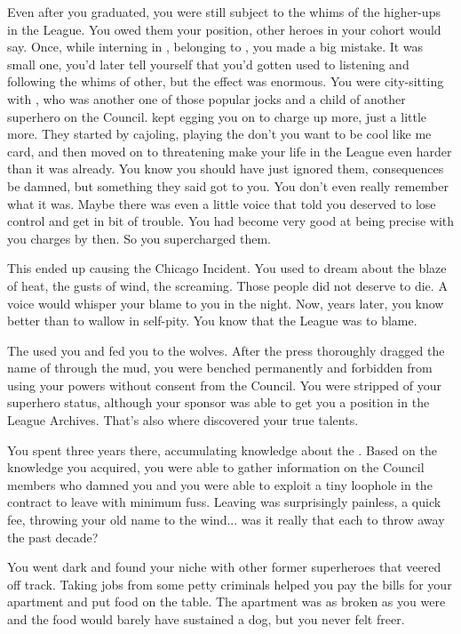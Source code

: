 \documentclass[char]{LRSguildcamp1}
\begin{document}
Even after you graduated, you were still subject to the whims of the higher-ups in the League. You owed them your position, other heroes in your cohort would say. Once, while interning in \pCityO{}, belonging to \cOS{\MYsupername}, you made a big mistake. It was small one, you'd later tell yourself that you'd gotten used to listening and following the whims of other, but the effect was enormous. You were city-sitting with  \cJuggernaut{}, who was another one of those popular jocks and a child of another superhero on the Council. \cJuggernaut{\They} kept egging you on to charge \cJuggernaut{\them} up more, just a little more. They started by cajoling, playing the don't you want to be cool like me card, and then moved on to threatening make your life in the League even harder than it was already. You know you should have just ignored them, consequences be damned, but something they said got to you. You don't even really remember what it was. Maybe there was even a little voice that told you \cJuggernaut{\they} deserved to lose control and get in bit of trouble. You had become very good at being precise with you charges by then. So you supercharged them.  

This ended up causing the Chicago Incident. You used to dream about the blaze of heat, the gusts of wind, the screaming. Those people did not deserve to die. A voice would whisper your blame to you in the night. Now, years later, you know better than to wallow in self-pity. You know that the League was to blame.  

The \cHeroLeague{} used you and fed you to the wolves. After the press thoroughly dragged the name of \cYSOldName{} through the mud, you were benched permanently and forbidden from using your powers without consent from the Council. You were stripped of your superhero status, although your sponsor was able to get you a position in the League Archives. That's also where discovered your true talents. 

You spent three years there, accumulating knowledge about the \cHeroLeague{}. Based on the knowledge you acquired, you were able to gather information on the Council members who damned you and you were able to exploit a tiny loophole in the contract to leave with minimum fuss.  Leaving was surprisingly painless, a quick fee, throwing your old name to the wind... was it really that each to throw away the past decade?  

You went dark and found your niche with other former superheroes that veered off track. Taking jobs from some petty criminals helped you pay the bills for your apartment and put food on the table. The apartment was as broken as you were and the food would barely have sustained a dog, but you never felt freer. 
\end{document}
